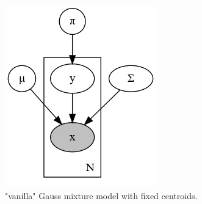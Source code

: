 \documentclass[11pt, a4paper]{report}
\theoremstyle{plain}
\theoremstyle{definition}
\theoremstyle{remark}
\begin{document}
\begin{figure}[!h]
\begin{framed}
\centering
\begin{subfigure}[b]{0.4\textwidth}
\includegraphics[width=\textwidth]{plots/mm.gv.png}
\caption{"vanilla" Gauss mixture model with fixed centroids.}
\label{fig:vanillamix}
\end{subfigure}
\begin{subfigure}[t]{0.4\textwidth}

\end{subfigure}
\end{framed}
\end{figure}
\end{document}
